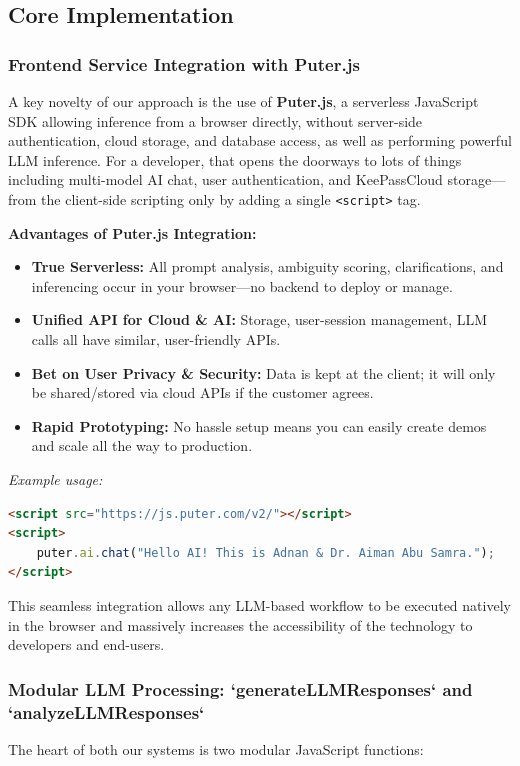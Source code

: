 \documentclass[conference]{IEEEtran}
\begin{document}
\subsection{Core Implementation}

\subsubsection{Frontend Service Integration with Puter.js}
A key novelty of our approach is the use of \textbf{Puter.js}, a serverless JavaScript SDK allowing inference from a browser directly, without server-side authentication, cloud storage, and database access, as well as performing powerful LLM inference. For a developer, that opens the doorways to lots of things including multi-model AI chat, user authentication, and KeePassCloud storage—from the client-side scripting only by adding a single \texttt{<script>} tag.

\textbf{Advantages of Puter.js Integration:}
\begin{itemize}
    \item \textbf{True Serverless:} All prompt analysis, ambiguity scoring, clarifications, and inferencing occur in your browser—no backend to deploy or manage.
    \item \textbf{Unified API for Cloud \& AI:} Storage, user-session management, LLM calls all have similar, user-friendly APIs.
    \item \textbf{Bet on User Privacy \& Security:} Data is kept at the client; it will only be shared/stored via cloud APIs if the customer agrees.
    \item \textbf{Rapid Prototyping:} No hassle setup means you can easily create demos and scale all the way to production.
\end{itemize}

\textit{Example usage:}

\begin{lstlisting}[language=HTML]
<script src="https://js.puter.com/v2/"></script>
<script>
    puter.ai.chat("Hello AI! This is Adnan & Dr. Aiman Abu Samra.");
</script>
\end{lstlisting}

This seamless integration allows any LLM-based workflow to be executed natively in the browser and massively increases the accessibility of the technology to developers and end-users.

\subsubsection{Modular LLM Processing: `generateLLMResponses` and `analyzeLLMResponses`}
The heart of both our systems is two modular JavaScript functions:
\end{document}
